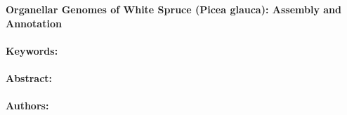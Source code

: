\noindent
\large {\bf Organellar Genomes of White Spruce (Picea glauca): Assembly and Annotation} 


\normalsize 


\noindent \paragraph{Keywords:} 

\noindent \paragraph{Abstract:} 



\noindent \paragraph{Authors:} 

